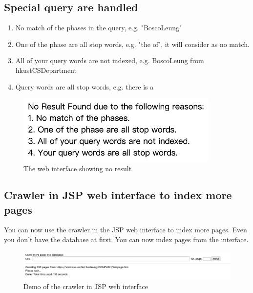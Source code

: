 \documentclass{article}
\begin{document}
        \subsection*{Special query are handled}
            \begin{enumerate}
                \item No match of the phases in the query, e.g. "BoscoLeung"
                \item One of the phase are all stop words, e.g. "the of", it will consider as no match.
                \item All of your query words are not indexed, e.g. BoscoLeung from hkustCSDepartment
                \item Query words are all stop words, e.g. there is a
            \end{enumerate}
            \begin{figure}[!htbp]
                \centering
                \label{}
                \includegraphics[width=10cm]{noResult.png}
                \caption{The web interface showing no result}
            \end{figure}

        \subsection*{Crawler in JSP web interface to index more pages}
            You can now use the crawler in the JSP web interface to index more pages. Even you don't have the database at first. You can now index pages from the interface.
            \begin{figure}[!htbp]
                \centering
                \label{}
                \includegraphics[width=17cm]{crawl_in_web.png}
                \caption{Demo of the crawler in JSP web interface}
            \end{figure}
\end{document}
